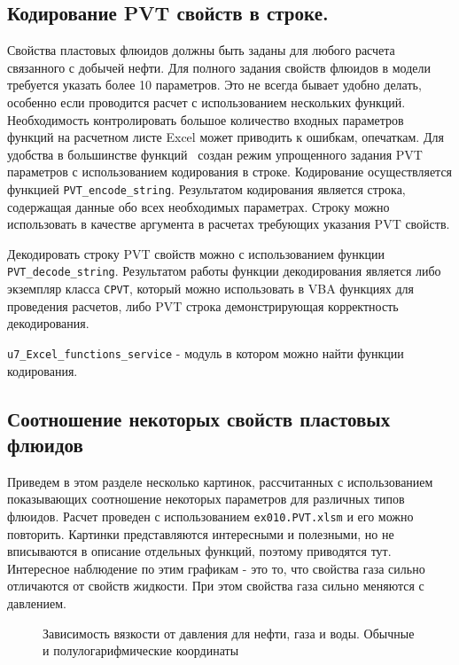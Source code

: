 \subsection{Кодирование PVT свойств в строке.}
Свойства пластовых флюидов должны быть заданы для любого расчета связанного с добычей нефти. Для полного задания свойств флюидов в модели \unf{} требуется указать более 10 параметров. Это не всегда бывает удобно делать, особенно если проводится расчет с использованием нескольких функций. Необходимость контролировать большое количество входных параметров функций на расчетном листе Excel может приводить к ошибкам, опечаткам.
Для удобства в большинстве функций \unf{} \ создан режим упрощенного задания PVT параметров с использованием кодирования в строке. Кодирование осуществляется функцией \texttt{PVT_encode_string}. Результатом кодирования является строка, содержащая данные обо всех необходимых параметрах. Строку можно использовать в качестве аргумента в расчетах требующих указания PVT свойств.   


Декодировать строку PVT свойств можно с использованием функции  \texttt{PVT_decode_string}. Результатом работы функции декодирования является либо экземпляр класса \texttt{CPVT}, который можно использовать в VBA функциях для проведения расчетов, либо PVT строка демонстрирующая корректность декодирования. 


\texttt{u7_Excel_functions_service} - модуль в котором можно найти функции кодирования. 

\subsection{Соотношение некоторых свойств пластовых флюидов}
Приведем в этом разделе несколько картинок, рассчитанных с использованием \unf{} показывающих соотношение некоторых параметров для различных типов флюидов. Расчет проведен с использованием \texttt{ex010.PVT.xlsm} и его можно повторить.
Картинки представляются интересными и полезными, но не вписываются в описание отдельных функций, поэтому приводятся тут.
Интересное наблюдение по этим графикам - это то, что свойства газа сильно отличаются от свойств жидкости. При этом свойства газа сильно меняются с давлением. 

\begin{figure}[H]
	\caption{Зависимость вязкости от давления для нефти, газа и воды. Обычные и полулогарифмические координаты}
	\label{ris:viscosity_plot}
\end{figure}

